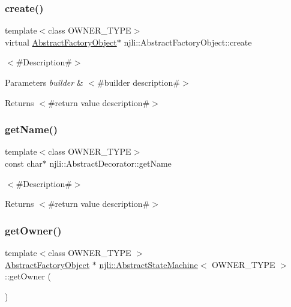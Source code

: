 \subsubsection{\texorpdfstring{create()}{create()}}
{\footnotesize\ttfamily template$<$class O\+W\+N\+E\+R\+\_\+\+T\+Y\+PE$>$ \\
virtual \mbox{\hyperlink{classnjli_1_1_abstract_factory_object}{Abstract\+Factory\+Object}}$\ast$ njli\+::\+Abstract\+Factory\+Object\+::create}

$<$\#\+Description\#$>$


\begin{DoxyParams}{Parameters}
{\em builder} & $<$\#builder description\#$>$\\
\hline
\end{DoxyParams}
\begin{DoxyReturn}{Returns}
$<$\#return value description\#$>$ 
\end{DoxyReturn}
\mbox{\label{classnjli_1_1_abstract_state_machine_ad41266885be835f3ee602311e20877a4}} 
\subsubsection{\texorpdfstring{get\+Name()}{getName()}}
{\footnotesize\ttfamily template$<$class O\+W\+N\+E\+R\+\_\+\+T\+Y\+PE$>$ \\
const char$\ast$ njli\+::\+Abstract\+Decorator\+::get\+Name}

$<$\#\+Description\#$>$

\begin{DoxyReturn}{Returns}
$<$\#return value description\#$>$ 
\end{DoxyReturn}
\mbox{\label{classnjli_1_1_abstract_state_machine_aabf808253d72265695e03c299a434798}} 
\subsubsection{\texorpdfstring{get\+Owner()}{getOwner()}\hspace{0.1cm}{\footnotesize\ttfamily [1/2]}}
{\footnotesize\ttfamily template$<$class O\+W\+N\+E\+R\+\_\+\+T\+Y\+PE $>$ \\
\mbox{\hyperlink{classnjli_1_1_abstract_factory_object}{Abstract\+Factory\+Object}} $\ast$ \mbox{\hyperlink{classnjli_1_1_abstract_state_machine}{njli\+::\+Abstract\+State\+Machine}}$<$ O\+W\+N\+E\+R\+\_\+\+T\+Y\+PE $>$\+::get\+Owner (\begin{DoxyParamCaption}{ }\end{DoxyParamCaption})\hspace{0.3cm}{\ttfamily [virtual]}}

